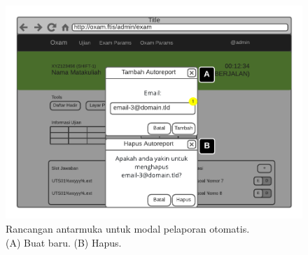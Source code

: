     \begin{figure}
        \centering
        \includegraphics[width=0.7\paperwidth]{Gambar/mockups/Mockup--Admin - Tambah Autoreport.pdf}
        \caption{Rancangan antarmuka untuk modal pelaporan otomatis. \\
            (A) Buat baru. (B) Hapus.}
        \label{fig:mockup_admin_exam_det_autoreport}
    \end{figure}
    

